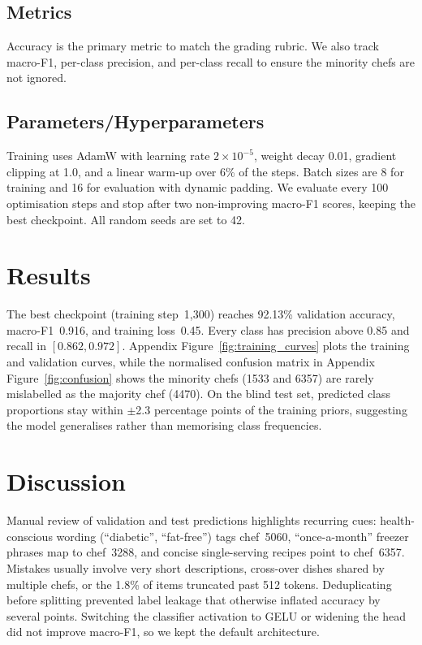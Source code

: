 \documentclass[twocolumn,10pt]{article}
\begin{document}
\subsection{Metrics}
Accuracy is the primary metric to match the grading rubric. We also track macro-F1, per-class precision, and per-class recall to ensure the minority chefs are not ignored.

\subsection{Parameters/Hyperparameters}
Training uses AdamW with learning rate $2\times10^{-5}$, weight decay 0.01, gradient clipping at 1.0, and a linear warm-up over 6\% of the steps. Batch sizes are 8 for training and 16 for evaluation with dynamic padding. We evaluate every 100 optimisation steps and stop after two non-improving macro-F1 scores, keeping the best checkpoint. All random seeds are set to 42.

\section{Results}
\label{sec:results}
The best checkpoint (training step~1{,}300) reaches 92.13\% validation accuracy, macro-F1~0.916, and training loss~0.45. Every class has precision above 0.85 and recall in $[0.862, 0.972]$. Appendix Figure~\ref{fig:training_curves} plots the training and validation curves, while the normalised confusion matrix in Appendix Figure~\ref{fig:confusion} shows the minority chefs (1533 and 6357) are rarely mislabelled as the majority chef (4470). On the blind test set, predicted class proportions stay within $\pm$2.3 percentage points of the training priors, suggesting the model generalises rather than memorising class frequencies.

\section{Discussion}
Manual review of validation and test predictions highlights recurring cues: health-conscious wording (``diabetic'', ``fat-free'') tags chef~5060, ``once-a-month'' freezer phrases map to chef~3288, and concise single-serving recipes point to chef~6357. Mistakes usually involve very short descriptions, cross-over dishes shared by multiple chefs, or the 1.8\% of items truncated past 512 tokens. Deduplicating before splitting prevented label leakage that otherwise inflated accuracy by several points. Switching the classifier activation to GELU or widening the head did not improve macro-F1, so we kept the default architecture.
\end{document}
